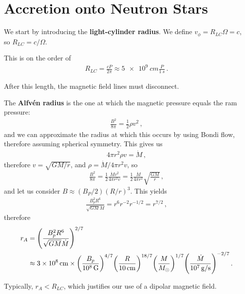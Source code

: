 \documentclass[main.tex]{subfiles}
\begin{document}
\section{Accretion onto Neutron Stars}

We start by introducing the \textbf{light-cylinder radius}.
We define \(v_\phi = R_{LC} \Omega = c\), so \(R_{LC} = c/  \Omega \).

This is on the order of 
%
\begin{align}
R_{LC} = \frac{cP}{2 \pi } \approx \SI{5e9}{cm} \frac{P}{\SI{1}{s}}
\,.
\end{align}

After this length, the magnetic field lines must disconnect. 

The \textbf{Alfvén radius} is the one at which the magnetic pressure equals the ram pressure: 
%
\begin{align}
\frac{B^2}{8 \pi } = \frac{1}{2} \rho v^2
\,,
\end{align}
%
and we can approximate the radius at which this occurs by using Bondi flow, therefore assuming spherical symmetry. 
This gives us 
%
\begin{align}
4 \pi r^2\rho v = \dot{M}
\,,
\end{align}
%
therefore \(v = \sqrt{GM /r}\), and \(\rho = \dot{M} / 4 \pi r^2 v \), so 
%
\begin{align}
\frac{B^2}{8 \pi } = \frac{1}{2} \frac{\dot{M} v^2}{4 \pi r^2v}
= \frac{1}{2} \frac{\dot{M}}{4 \pi r^2} \sqrt{ \frac{GM}{r}}
\,,
\end{align}
%
and let us consider \(B \approx (B_P /2) (R / r)^3\). 
This yields 
%
\begin{align}
\frac{B_p^2 R^{6}}{\sqrt{GM} \dot{M}} = r^{6} r^{-2} r^{-1/2} = r^{7/2}
\,,
\end{align}
%
therefore 
%
\begin{align}
r_A &= \qty(\frac{B_p^2 R^{6}}{\sqrt{GM} \dot{M}})^{2/7}  \\
&\approx \SI{3e8}{cm} \times \qty(\frac{B_p}{\SI{e8}{G}})^{4/7}
\qty(\frac{R}{\SI{10}{cm}})^{18/7} \qty(\frac{M}{M_{\odot}})^{1/7} 
\qty(\frac{\dot{M}}{\SI{e7}{g/s}})^{-2/7}
\,.
\end{align}

Typically, \(r_A < R_{LC}\), which justifies our use of a dipolar magnetic field. 
\end{document}
